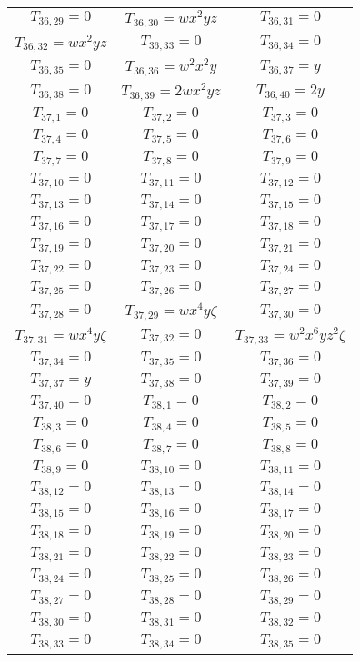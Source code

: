 \documentclass[12pt]{memoireuqam1.3}
\begin{document}
\begin{longtable}{|c|c|c|}
$T_{36,29}= 0$&
$T_{36,30}= wx^2yz$&
$T_{36,31}= 0$\\
$T_{36,32}= wx^2yz$&
$T_{36,33}= 0$&
$T_{36,34}= 0$\\
$T_{36,35}= 0$&
$T_{36,36}= w^2x^2y$&
$T_{36,37}= y$\\
$T_{36,38}= 0$&
$T_{36,39}= 2wx^2yz$&
$T_{36,40}= 2y$\\
$T_{37,1}= 0$&
$T_{37,2}= 0$&
$T_{37,3}= 0$\\
$T_{37,4}= 0$&
$T_{37,5}= 0$&
$T_{37,6}= 0$\\
$T_{37,7}= 0$&
$T_{37,8}= 0$&
$T_{37,9}= 0$\\
$T_{37,10}= 0$&
$T_{37,11}= 0$&
$T_{37,12}= 0$\\
$T_{37,13}= 0$&
$T_{37,14}= 0$&
$T_{37,15}= 0$\\
$T_{37,16}= 0$&
$T_{37,17}= 0$&
$T_{37,18}= 0$\\
$T_{37,19}= 0$&
$T_{37,20}= 0$&
$T_{37,21}= 0$\\
$T_{37,22}= 0$&
$T_{37,23}= 0$&
$T_{37,24}= 0$\\
$T_{37,25}= 0$&
$T_{37,26}= 0$&
$T_{37,27}= 0$\\
$T_{37,28}= 0$&
$T_{37,29}= wx^4y\zeta$&
$T_{37,30}= 0$\\
$T_{37,31}= wx^4y\zeta$&
$T_{37,32}= 0$&
$T_{37,33}= w^2x^6yz^2\zeta$\\
$T_{37,34}= 0$&
$T_{37,35}= 0$&
$T_{37,36}= 0$\\
$T_{37,37}= y$&
$T_{37,38}= 0$&
$T_{37,39}= 0$\\
$T_{37,40}= 0$&
$T_{38,1}= 0$&
$T_{38,2}= 0$\\
$T_{38,3}= 0$&
$T_{38,4}= 0$&
$T_{38,5}= 0$\\
$T_{38,6}= 0$&
$T_{38,7}= 0$&
$T_{38,8}= 0$\\
$T_{38,9}= 0$&
$T_{38,10}= 0$&
$T_{38,11}= 0$\\
$T_{38,12}= 0$&
$T_{38,13}= 0$&
$T_{38,14}= 0$\\
$T_{38,15}= 0$&
$T_{38,16}= 0$&
$T_{38,17}= 0$\\
$T_{38,18}= 0$&
$T_{38,19}= 0$&
$T_{38,20}= 0$\\
$T_{38,21}= 0$&
$T_{38,22}= 0$&
$T_{38,23}= 0$\\
$T_{38,24}= 0$&
$T_{38,25}= 0$&
$T_{38,26}= 0$\\
$T_{38,27}= 0$&
$T_{38,28}= 0$&
$T_{38,29}= 0$\\
$T_{38,30}= 0$&
$T_{38,31}= 0$&
$T_{38,32}= 0$\\
$T_{38,33}= 0$&
$T_{38,34}= 0$&
$T_{38,35}= 0$\\

\end{longtable}
\end{document}
